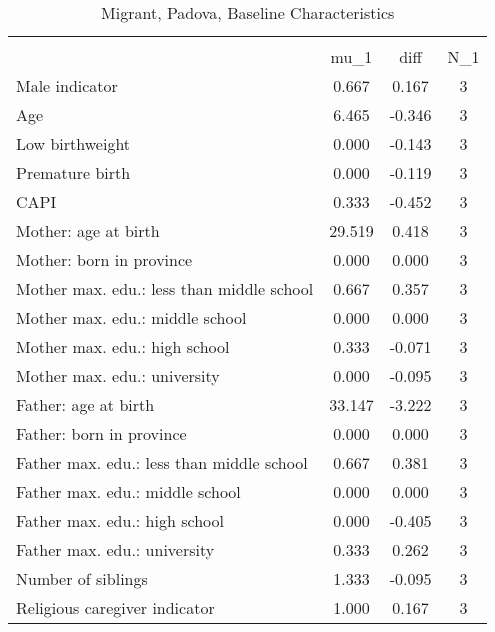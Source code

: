 \begin{table}[htbp]\centering
\def\sym#1{\ifmmode^{#1}\else\(^{#1}\)\fi}
\caption{Migrant, Padova, Baseline Characteristics}
\begin{tabular}{l*{1}{ccc}}
\toprule
                    &\multicolumn{3}{c}{}                           \\
                    &        mu\_1         &        diff&         N\_1\\
\midrule
Male indicator      &       0.667         &       0.167&           3\\
Age                 &       6.465         &      -0.346&           3\\
Low birthweight     &       0.000         &      -0.143&           3\\
Premature birth     &       0.000         &      -0.119&           3\\
CAPI                &       0.333         &      -0.452&           3\\
Mother: age at birth&      29.519         &       0.418&           3\\
Mother: born in province&       0.000         &       0.000&           3\\
Mother max. edu.: less than middle school&       0.667         &       0.357&           3\\
Mother max. edu.: middle school&       0.000         &       0.000&           3\\
Mother max. edu.: high school&       0.333         &      -0.071&           3\\
Mother max. edu.: university&       0.000         &      -0.095&           3\\
Father: age at birth&      33.147         &      -3.222&           3\\
Father: born in province&       0.000         &       0.000&           3\\
Father max. edu.: less than middle school&       0.667         &       0.381&           3\\
Father max. edu.: middle school&       0.000         &       0.000&           3\\
Father max. edu.: high school&       0.000         &      -0.405&           3\\
Father max. edu.: university&       0.333         &       0.262&           3\\
Number of siblings  &       1.333         &      -0.095&           3\\
Religious caregiver indicator&       1.000         &       0.167&           3\\

\end{tabular}
\end{table}
